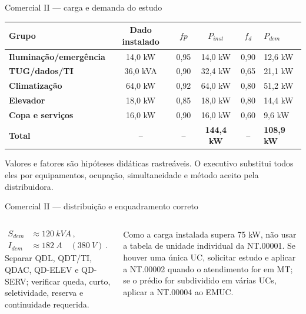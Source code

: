 \begin{frame}[shrink=5]{Comercial II — carga e demanda do estudo}
\scriptsize
\begin{tabularx}{\textwidth}{>{\bfseries}p{3.0cm}c c c c X}
\toprule
Grupo & Dado instalado & $fp$ & $P_{inst}$ & $f_d$ & $P_{dem}$\\
\midrule
Iluminação/emergência & 14,0 kW & 0,95 & 14,0 kW & 0,90 & 12,6 kW\\
TUG/dados/TI & 36,0 kVA & 0,90 & 32,4 kW & 0,65 & 21,1 kW\\
Climatização & 64,0 kW & 0,92 & 64,0 kW & 0,80 & 51,2 kW\\
Elevador & 18,0 kW & 0,85 & 18,0 kW & 0,80 & 14,4 kW\\
Copa e serviços & 16,0 kW & 0,90 & 16,0 kW & 0,60 & 9,6 kW\\
\midrule
\textbf{Total} & -- & -- & \textbf{144,4 kW} & -- & \textbf{108,9 kW}\\
\bottomrule
\end{tabularx}
\begin{caixaAt}
Valores e fatores são hipóteses didáticas rastreáveis. O executivo substitui todos eles por equipamentos, ocupação, simultaneidade e método aceito pela distribuidora.
\end{caixaAt}
\end{frame}

\begin{frame}{Comercial II — distribuição e enquadramento correto}
\small\begin{columns}[T,onlytextwidth]
\begin{caixaProjeto}[title=Distribuição]
\[
\begin{aligned}
S_{dem}&\approx\SI{120}{kVA}\,,\\
I_{dem}&\approx\SI{182}{A}\quad(\SI{380}{V})\,.
\end{aligned}
\]
Separar QDL, QDT/TI, QDAC, QD-ELEV e QD-SERV; verificar queda, curto, seletividade, reserva e continuidade requerida.
\end{caixaProjeto}
\begin{caixaNorma}[title=Conexão]
Como a carga instalada supera 75 kW, não usar a tabela de unidade individual da NT.00001. Se houver uma única UC, solicitar estudo e aplicar a NT.00002 quando o atendimento for em MT; se o prédio for subdividido em várias UCs, aplicar a NT.00004 ao EMUC.
\end{caixaNorma}
\end{columns}
\end{frame}

